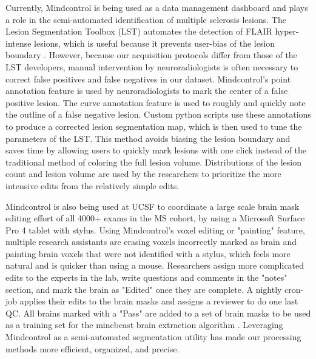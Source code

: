 Currently, Mindcontrol is being used as a data management dashboard and plays a role in the semi-automated identification of multiple sclerosis lesions. The Lesion Segmentation Toolbox (LST) automates the detection of FLAIR hyper-intense lesions, which is useful because it prevents user-bias of the lesion boundary \cite{Schmidt_2012}. However, because our acquisition protocols differ from those of the LST developers, manual intervention by neuroradiologists is often necessary to correct false positives and false negatives in our dataset. Mindcontrol's point annotation feature is used by neuroradiologists to mark the center of a false positive lesion. The curve annotation feature is used to roughly and quickly note the outline of a false negative lesion. Custom python scripts use these annotations to produce a corrected lesion segmentation map, which is then used to tune the parameters of the LST. This method avoids biasing the lesion boundary and saves time by allowing users to quickly mark lesions with one click instead of the traditional method of coloring the full lesion volume. Distributions of the lesion count and lesion volume are used by the researchers to prioritize the more intensive edits from the relatively simple edits.

Mindcontrol is also being used at UCSF to coordinate a large scale brain mask editing effort of all 4000+ exams in the MS cohort, by using a Microsoft Surface Pro 4 tablet with stylus. Using Mindcontrol's voxel editing or "painting" feature, multiple research assistants are erasing voxels incorrectly marked as brain and painting brain voxels that were not identified with a stylus, which feels more natural and is quicker than using a mouse. Researchers assign more complicated edits to the experts in the lab, write questions and comments in the "notes" section, and mark the brain as "Edited" once they are complete. A nightly cron-job applies their edits to the brain masks and assigns a reviewer to do one last QC. All brains marked with a "Pass" are added to a set of brain masks to be  used as a training set for the mincbeast brain extraction algorithm \cite{eskildsen2012beast}. Leveraging Mindcontrol as a semi-automated segmentation utility has made our processing methods more efficient, organized, and precise.





